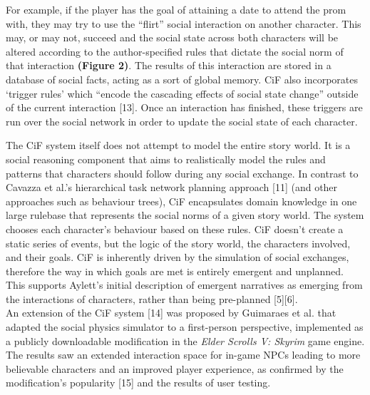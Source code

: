 \documentclass{sig-alternate-05-2015}
\begin{document}
For example, if the player has the goal of attaining a date to attend the prom with, they may try to use the ``flirt'' social interaction on another character. This may, or may not, succeed and the social state across both characters will be altered according to the author-specified rules that dictate the social norm of that interaction \textbf{(Figure 2)}. The results of this interaction are stored in a database of social facts, acting as a sort of global memory. CiF also incorporates `trigger rules' which ``encode the cascading effects of social state change'' outside of the current interaction [13]. Once an interaction has finished, these triggers are run over the social network in order to update the social state of each character.

The CiF system itself does not attempt to model the entire story world. It is a social reasoning component that aims to realistically model the rules and patterns that characters should follow during any social exchange. In contrast to Cavazza et al.'s hierarchical task network planning approach [11] (and other approaches such as behaviour trees), CiF encapsulates domain knowledge in one large rulebase that represents the social norms of a given story world. The system chooses each character's behaviour based on these rules. CiF doesn't create a static series of events, but the logic of the story world, the characters involved, and their goals. CiF is inherently driven by the simulation of social exchanges, therefore the way in which goals are met is entirely emergent and unplanned. This supports Aylett's initial description of emergent narratives as emerging from the interactions of characters, rather than being pre-planned [5][6].\\

\newline An extension of the CiF system [14] was proposed by Guimaraes et al. that adapted the social physics simulator to a first-person perspective, implemented as a publicly downloadable modification in the \textit{Elder Scrolls V: Skyrim} game engine. The results saw an extended interaction space for in-game NPCs leading to more believable characters and an improved player experience, as confirmed by the modification's popularity [15] and the results of user testing.
\end{document}
